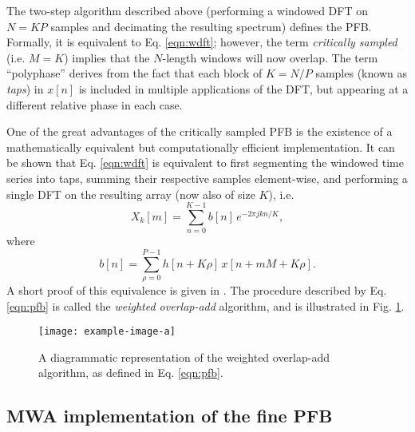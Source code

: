 \documentclass{pasa}%
\begin{document}
The two-step algorithm described above (performing a windowed DFT on $N = KP$ samples and decimating the resulting spectrum) defines the PFB.
Formally, it is equivalent to Eq. \eqref{eqn:wdft}; however, the term \textit{critically sampled} (i.e. $M = K$) implies that the $N$-length windows will now overlap.
The term ``polyphase'' derives from the fact that each block of $K = N/P$ samples (known as \textit{taps}) in $x[n]$ is included in multiple applications of the DFT, but appearing at a different relative phase in each case.

One of the great advantages of the critically sampled PFB is the existence of a mathematically equivalent but computationally efficient implementation.
It can be shown that Eq. \eqref{eqn:wdft} is equivalent to first segmenting the windowed time series into taps, summing their respective samples element-wise, and performing a single DFT on the resulting array (now also of size $K$), i.e.
\begin{equation}
    X_k[m] = \sum_{n=0}^{K-1} b[n]\,e^{-2\pi jkn/K},
    \label{eqn:pfb}
\end{equation}
where
\begin{equation*}
    b[n] = \sum_{\rho=0}^{P-1} h[n + K\rho]\,x[n + mM + K\rho].
\end{equation*}
A short proof of this equivalence is given in \citet{Harris2011}.
The procedure described by Eq. \eqref{eqn:pfb} is called the \textit{weighted overlap-add} algorithm, and is illustrated in Fig. \ref{fig:pfb}.
\begin{figure}[t]
    \centering
    \texttt{[image: example-image-a]}
    \caption{A diagrammatic representation of the weighted overlap-add algorithm, as defined in Eq. \eqref{eqn:pfb}.}
    \label{fig:pfb}
\end{figure}


\subsection{MWA implementation of the fine PFB}
\end{document}
